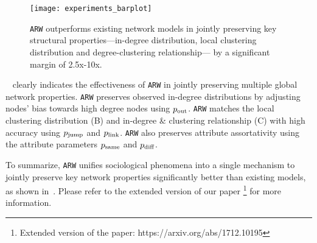\begin{figure}
	\centering
	\texttt{[image: experiments\_barplot]}
		\caption{\texttt{ARW} outperforms
			existing network models in jointly preserving key structural properties---in-degree
			distribution, local clustering distribution and degree-clustering relationship---
			by a significant margin of 2.5x-10x.
		}
		\label{fig:barplot}
		\vspace{-10pt}
\end{figure}

~ clearly indicates the effectiveness
of \texttt{ARW} in {jointly} preserving multiple
global network properties. \texttt{ARW} preserves observed
in-degree distributions by adjusting nodes' bias towards high degree nodes
using $p_{\scriptsize\mbox{out}}$.
\texttt{ARW} matches the local clustering
distribution  (B) and in-degree \& clustering relationship
(C) with high accuracy using $p_{\scriptsize\mbox{jump}}$ and
$p_{\scriptsize\mbox{link}}$. \texttt{ARW} also preserves attribute assortativity using
the attribute parameters $p_{\scriptsize\mbox{same}}$ and $p_{\scriptsize\mbox{diff}}$.

To summarize, \texttt{ARW} unifies sociological phenomena into a single
mechanism to jointly preserve key network properties significantly
better than existing models, as shown in~.
Please refer to the extended version of
our paper \footnote{Extended version of the paper: https://arxiv.org/abs/1712.10195} for
more information.




